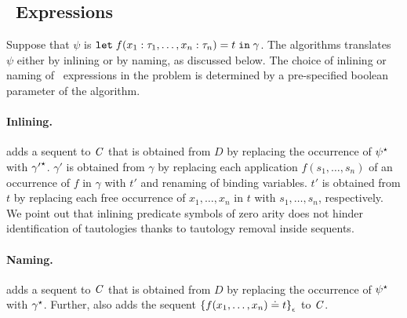 
\subsection*{\LETIN\ Expressions}
\label{subsect:letin}
Suppose that $\psi$ is $\mathtt{let}\;{f(x_1:\tau_1,\ldots,x_n:\tau_n)}={t}\;\allowbreak\mathtt{in}\;{\gamma}$. 
The \nfcnf{} algorithms translates $\psi$ either by inlining or by naming, as discussed below.  
The choice of inlining or naming of \LETIN\ expressions in the problem is determined by a pre-specified boolean parameter of the algorithm. %
    
\paragraph{Inlining.} \nfcnf{} adds a sequent to $\mathit{C}$ that is obtained from $D$ by replacing the occurrence of ${\psi}^{\star}$ with ${\gamma'}^{\star}$. $\gamma'$ is obtained from $\gamma$ by replacing each application $f(s_1,\ldots,s_n)$ of an %
occurrence of $f$ in $\gamma$ with $t'$ and renaming of binding variables. $t'$ is obtained from $t$ by replacing each free occurrence of $x_1,\ldots,x_n$ in $t$ with $s_1,\ldots,s_n$, respectively. We point out that inlining predicate symbols of zero arity does not hinder identification of tautologies thanks to tautology removal inside sequents.

\paragraph{Naming.} \nfcnf{} adds a sequent to $\mathit{C}$ that is obtained from $D$ by replacing the occurrence of ${\psi}^{\star}$ with ${\gamma}^{\star}$.
Further, \nfcnf{} also adds the sequent ${\{f(x_1,\ldots,x_n) \doteq t\}}_{\epsilon}$ to $\mathit{C}$.
    

